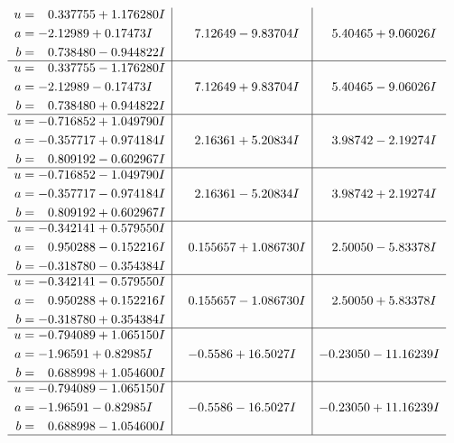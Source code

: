 \documentclass[1p]{elsarticle_modified}
\theoremstyle{definition}
\begin{document}
$$\begin{array}{c|c|c}
\begin{aligned}
u &= \phantom{-}0.337755 + 1.176280 I \\
a &= -2.12989 + 0.17473 I \\
b &= \phantom{-}0.738480 - 0.944822 I\end{aligned}
 & \phantom{-}7.12649 - 9.83704 I & \phantom{-}5.40465 + 9.06026 I \\ \hline\begin{aligned}
u &= \phantom{-}0.337755 - 1.176280 I \\
a &= -2.12989 - 0.17473 I \\
b &= \phantom{-}0.738480 + 0.944822 I\end{aligned}
 & \phantom{-}7.12649 + 9.83704 I & \phantom{-}5.40465 - 9.06026 I \\ \hline\begin{aligned}
u &= -0.716852 + 1.049790 I \\
a &= -0.357717 + 0.974184 I \\
b &= \phantom{-}0.809192 - 0.602967 I\end{aligned}
 & \phantom{-}2.16361 + 5.20834 I & \phantom{-}3.98742 - 2.19274 I \\ \hline\begin{aligned}
u &= -0.716852 - 1.049790 I \\
a &= -0.357717 - 0.974184 I \\
b &= \phantom{-}0.809192 + 0.602967 I\end{aligned}
 & \phantom{-}2.16361 - 5.20834 I & \phantom{-}3.98742 + 2.19274 I \\ \hline\begin{aligned}
u &= -0.342141 + 0.579550 I \\
a &= \phantom{-}0.950288 - 0.152216 I \\
b &= -0.318780 - 0.354384 I\end{aligned}
 & \phantom{-}0.155657 + 1.086730 I & \phantom{-}2.50050 - 5.83378 I \\ \hline\begin{aligned}
u &= -0.342141 - 0.579550 I \\
a &= \phantom{-}0.950288 + 0.152216 I \\
b &= -0.318780 + 0.354384 I\end{aligned}
 & \phantom{-}0.155657 - 1.086730 I & \phantom{-}2.50050 + 5.83378 I \\ \hline\begin{aligned}
u &= -0.794089 + 1.065150 I \\
a &= -1.96591 + 0.82985 I \\
b &= \phantom{-}0.688998 + 1.054600 I\end{aligned}
 & -0.5586 + 16.5027 I & -0.23050 - 11.16239 I \\ \hline\begin{aligned}
u &= -0.794089 - 1.065150 I \\
a &= -1.96591 - 0.82985 I \\
b &= \phantom{-}0.688998 - 1.054600 I\end{aligned}
 & -0.5586 - 16.5027 I & -0.23050 + 11.16239 I\\
 \hline 
 \end{array}$$\newpage\newpage\renewcommand{\arraystretch}{1}
\end{document}
